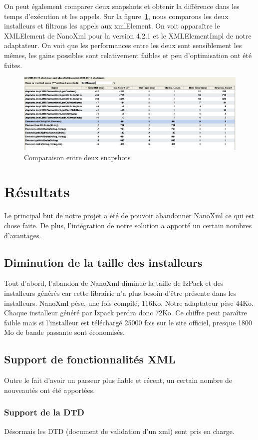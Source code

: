 On peut également comparer deux snapshots et obtenir la différence dans les temps d'exécution et les appels.
Sur la figure~\ref{fig:yourkitComparaison}, nous comparons les deux installeurs et filtrons les appels aux xmlElement.
On voit apparaître le XMLElement de NanoXml pour la version 4.2.1 et le XMLElementImpl de notre adaptateur.
On voit que les performances entre les deux sont sensiblement les mêmes, les gains possibles sont relativement faibles et peu d'optimisation ont été faites. 
\begin{figure}[H]
	\centering
	\includegraphics[width=1\textwidth]{../image/yourkitComparaison.png}
	\caption{Comparaison entre deux snapshots}
	\label{fig:yourkitComparaison}
\end{figure}
\section{Résultats}
Le principal but de notre projet a été de pouvoir abandonner NanoXml ce qui est chose faite.
De plus, l'intégration de notre solution a apporté un certain nombres d'avantages.
\subsection{Diminution de la taille des installeurs}
Tout d'abord, l'abandon de NanoXml diminue la taille de IzPack et des installeurs générés car cette librairie n'a plus besoin d'être présente dans les installeurs.
NanoXml pèse, une fois compilé, 116Ko.
Notre adaptateur pèse 44Ko.
Chaque installeur généré par Izpack perdra donc 72Ko.
Ce chiffre peut paraître faible mais si l'installeur est téléchargé 25000 fois sur le site officiel, presque 1800 Mo de bande passante sont économisés.
\subsection{Support de fonctionnalités XML}
Outre le fait d'avoir un parseur plus fiable et récent, un certain nombre de nouveautés ont été apportées.
\subsubsection{Support de la DTD}
Désormais les DTD (document de validation d'un xml) sont pris en charge.
